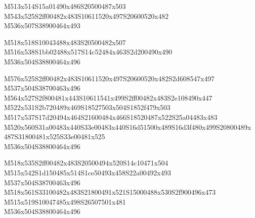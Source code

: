 \documentclass{article}
\begin{document}
\begin{multicols}{5}
\begin{center}
M513x514S15a01490x486S20500487x503 %
\\M543x525S2ff00482x483S10611520x497S20600520x482 %
\\M536x507S38900464x493 %

M518x518S10043488x483S20500482x507 %
\\M516x538S1bb02488x517S14c52484x463S2d200490x490 %
\\M536x504S38800464x496 %

M576x525S2ff00482x483S10611520x497S20600520x482S2d608547x497 %
\\M537x504S38700463x496 %
\\M564x527S2f800481x443S10611541x499S2ff00482x483S2e108490x447 %
\\M522x531S2b720489x469S18527503x504S1852f479x503 %
\\M517x537S17d20494x464S21600484x466S18520487x522S25a04483x483 %
\\M520x560S31a00483x440S33e00483x440S16d51500x489S16d3f480x499S20800489x487S31800481x525S33e00481x525 %
\\M536x504S38800464x496 %

M518x535S2ff00482x483S20500494x520S14c10471x504 %
\\M515x542S1d150485x514S1ce50493x458S22a00492x493 %
\\M537x504S38700463x496 %
\\M518x561S33100482x483S21800491x521S15000488x530S2f900496x473 %
\\M515x519S10047485x498S26507501x481 %
\\M536x504S38800464x496 %

\end{center}
\end{multicols}
\end{document}

